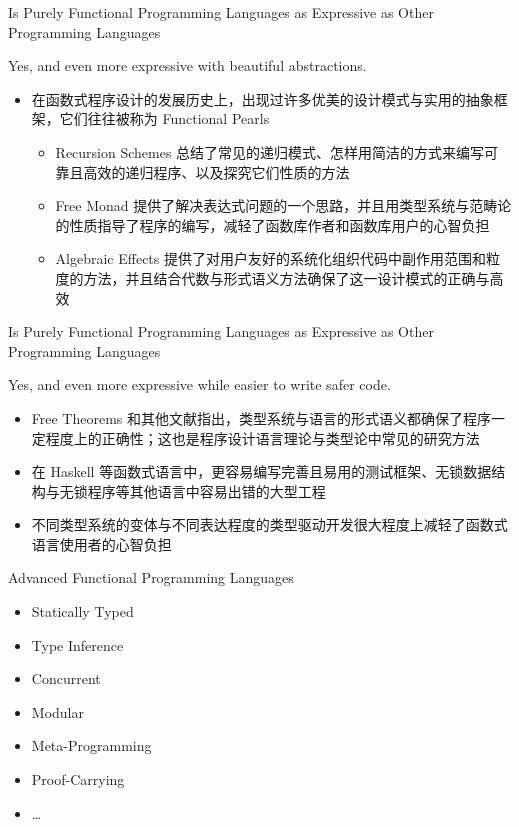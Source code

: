 \documentclass{beamer}
\begin{document}
\begin{frame}[fragile]{Is Purely Functional Programming Languages as Expressive as Other Programming Languages}

Yes, and even more expressive with beautiful abstractions.

\begin{itemize}
    \item 在函数式程序设计的发展历史上，出现过许多优美的设计模式与实用的抽象框架，它们往往被称为 Functional Pearls
\begin{itemize}
\pause\item Recursion Schemes 总结了常见的递归模式、怎样用简洁的方式来编写可靠且高效的递归程序、以及探究它们性质的方法
\pause\item Free Monad 提供了解决表达式问题的一个思路，并且用类型系统与范畴论的性质指导了程序的编写，减轻了函数库作者和函数库用户的心智负担
\pause\item Algebraic Effects 提供了对用户友好的系统化组织代码中副作用范围和粒度的方法，并且结合代数与形式语义方法确保了这一设计模式的正确与高效
\end{itemize}
\end{itemize}

\end{frame}

\begin{frame}[fragile]{Is Purely Functional Programming Languages as Expressive as Other Programming Languages}

Yes, and even more expressive while easier to write safer code.
\begin{itemize}
    \pause\item Free Theorems 和其他文献指出，类型系统与语言的形式语义都确保了程序一定程度上的正确性；这也是程序设计语言理论与类型论中常见的研究方法
    \pause\item 在 Haskell 等函数式语言中，更容易编写完善且易用的测试框架、无锁数据结构与无锁程序等其他语言中容易出错的大型工程
    \pause\item 不同类型系统的变体与不同表达程度的类型驱动开发很大程度上减轻了函数式语言使用者的心智负担
\end{itemize}
\end{frame}

\begin{frame}{Advanced Functional Programming Languages}
\begin{itemize}
\item Statically Typed
\item Type Inference
\item Concurrent
\item Modular
\item Meta-Programming
\item Proof-Carrying
\item \ldots
\end{itemize}
\end{frame}
\end{document}
